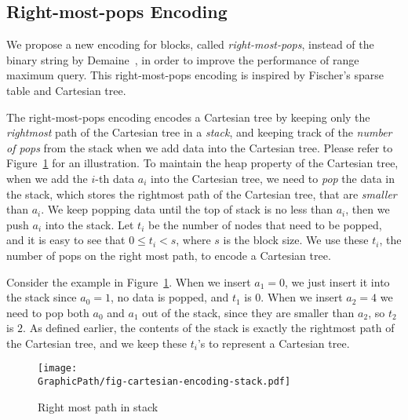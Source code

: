 
\subsection{Right-most-pops Encoding} \label{sec:cct}

We propose a new encoding for blocks, called {\em right-most-pops},
instead of the binary string by Demaine~\cite{Demaine2009OnCT}, in
order to improve the performance of range maximum query.  This
right-most-pops encoding is inspired by Fischer's sparse table and
Cartesian tree.

The right-most-pops encoding encodes a Cartesian tree by keeping only
the {\em rightmost} path of the Cartesian tree in a {\em stack}, and
keeping track of the {\em number of pops} from the stack when we add
data into the Cartesian tree.  Please refer to
Figure~\ref{fig:interval-cartesian} for an illustration.  To maintain
the heap property of the Cartesian tree, when we add the $i$-th data
$a_i$ into the Cartesian tree, we need to {\em pop} the data in the
stack, which stores the rightmost path of the Cartesian tree, that are
{\em smaller} than $a_i$.  We keep popping data until the top of stack
is no less than $a_i$, then we push $a_i$ into the stack.  Let $t_i$
be the number of nodes that need to be popped, and it is easy to see
that $0 \le t_i < s$, where $s$ is the block size.  We use these
$t_i$, the number of pops on the right most path, to encode a
Cartesian tree.

Consider the example in Figure~\ref{fig:interval-cartesian}.  When we
insert $a_1 = 0$, we just insert it into the stack since $a_0 = 1$, no
data is popped, and $t_1$ is $0$.  When we insert $a_2 = 4$ we need to
pop both $a_0$ and $a_1$ out of the stack, since they are smaller than
$a_2$, so $t_2$ is $2$.  As defined earlier, the contents of the stack
is exactly the rightmost path of the Cartesian tree, and we keep these
$t_i$'s to represent a Cartesian tree.

\begin{figure}[!thb]
  \centering
  \texttt{[image: \\GraphicPath/fig-cartesian-encoding-stack.pdf]}
  \caption{Right most path in stack}
  \label{fig:interval-cartesian}
\end{figure}


